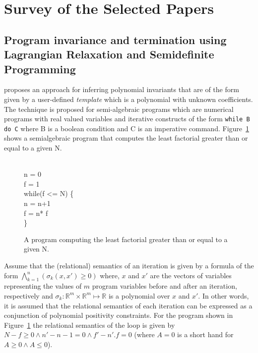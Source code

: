 \newcommand{\real}{\mathbb{R}}
\newcommand{\lmige}{\succcurlyeq}

\section{Survey of the Selected Papers}

\subsection{Program invariance and termination using Lagrangian Relaxation and Semidefinite Programming}

\cite{cousot:VMCAI05} proposes an approach for inferring polynomial invariants that 
are of the form given by a user-defined \emph{template} which is a polynomial with unknown coefficients.
The technique is proposed for semi-algebraic programs which are numerical programs with real valued variables 
and iterative constructs of the form \texttt{while B do C} where B is a boolean condition 
and C is an imperative command. Figure~\ref{fig:SAprogram} shows a semialgebraic program that computes the least factorial greater than or equal to a given N.
%
\begin{figure}
\begin{myprogram}
\\
\pnl \>  n = 0 \\
\pnl \> f = 1 \\
\pnl \> while(f <= N) \{ \\
\pnl \> \> n = n+1 \\
\pnl \> \> f = n* f \\
\pnl \> \}
\end{myprogram}
\caption{A program computing the least factorial greater than or equal to a given N.} \label{fig:SAprogram}
\end{figure}
%
Assume that the (relational) semantics of an iteration is given by a formula of the form
$\bigwedge \limits_{k=1}^{n} (\sigma_k(x,x') \ge 0)$ where, $x$ and $x'$ are the vectors of
variables representing the values of $m$ program variables before and after an iteration, respectively 
and $\sigma_k : \real^m \times \real^m \mapsto \real$ is a polynomial over $x$ and $x'$. 
In other words, it is assumed that the relational semantics of each
iteration can be expressed as a conjunction of polynomial positivity constraints.
For the program shown in Figure~\ref{fig:SAprogram} the relational semantics of the 
loop is given by $N-f \ge 0 \wedge n' -n -1 = 0 \wedge f' - n'.f = 0$ (where 
$A = 0$ is a short hand for $A \ge 0 \wedge A \le 0$).

